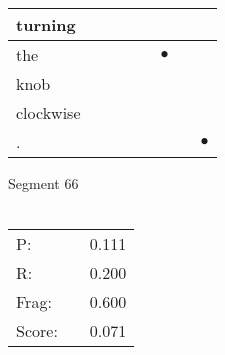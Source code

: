 \documentclass[landscape]{article}
\newcommand{\ssp}{\hspace{2pt}}
\newcommand{\mex}{\cellcolor{g}$\bullet$}
\begin{document}
\begin{tabular}{|l|p{10pt}|p{10pt}|p{10pt}|p{10pt}|p{10pt}|p{10pt}|p{10pt}|}
\hline
\ssp turning \ssp&\hspace{2pt}&\hspace{2pt}&\hspace{2pt}&\hspace{2pt}&\hspace{2pt}&\hspace{2pt}&\hspace{2pt}\\
\hline
\ssp \cellcolor{ref4}the \ssp&\hspace{2pt}&\hspace{2pt}&\hspace{2pt}&\hspace{2pt}&\hspace{2pt}\mex&\hspace{2pt}&\hspace{2pt}\\
\hline
\ssp knob \ssp&\hspace{2pt}&\hspace{2pt}&\hspace{2pt}&\hspace{2pt}&\hspace{2pt}&\hspace{2pt}&\hspace{2pt}\\
\hline
\ssp clockwise \ssp&\hspace{2pt}&\hspace{2pt}&\hspace{2pt}&\hspace{2pt}&\hspace{2pt}&\hspace{2pt}&\hspace{2pt}\\
\hline
\ssp \cellcolor{ref6}. \ssp&\hspace{2pt}&\hspace{2pt}&\hspace{2pt}&\hspace{2pt}&\hspace{2pt}&\hspace{2pt}&\hspace{2pt}\mex\\
\hline
\end{tabular}

\vspace{6pt}
\noindent Segment 66\\\\
\noindent\begin{tabular}{lm{12pt}r}
\hline
P:&&0.111\\
R:&&0.200\\
Frag:&&0.600\\
Score:&&0.071\\
\end{tabular}
\end{document}
